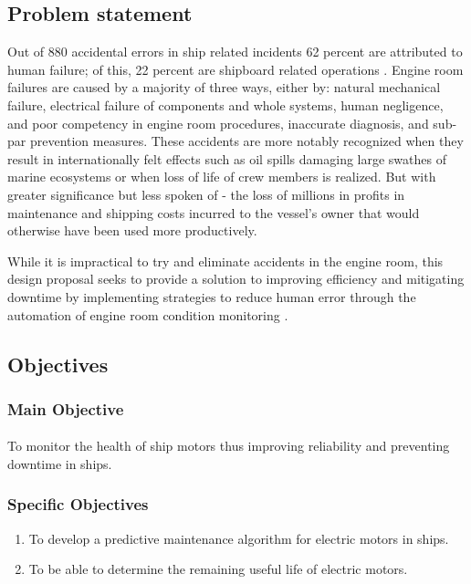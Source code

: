 \subsection{Problem  statement}
 Out of 880 accidental errors in ship related incidents 62 percent are attributed to human failure; of this, 22 percent are shipboard related operations \cite{bratic_review_2019}. Engine room failures are caused by a majority of three ways, either by: natural mechanical failure, electrical failure of components and whole systems, human negligence, and poor competency in engine room procedures, inaccurate diagnosis, and sub-par prevention measures. These accidents are more notably recognized when they result in internationally felt effects such as oil spills damaging large swathes of marine ecosystems or when loss of life of crew members is realized. But with greater significance but less spoken of - the loss of millions in profits in maintenance and shipping costs incurred to the vessel’s owner that would otherwise have been used more productively. 
 

  While it is impractical to try and eliminate accidents in the engine room, this design proposal seeks to provide a solution to improving efficiency and mitigating downtime by implementing strategies to reduce human error through the automation of engine room condition monitoring \cite{noauthor_13_nodate}. 



\subsection{Objectives}
\subsubsection{Main Objective}
\paragraph{}  To monitor the health of ship motors thus improving reliability and preventing downtime
in ships. 
\subsubsection{Specific Objectives}
\begin{enumerate}
\item  To develop a predictive maintenance algorithm for electric motors in ships.
\item To be able to determine the remaining useful life of electric motors. 

\end{enumerate}
